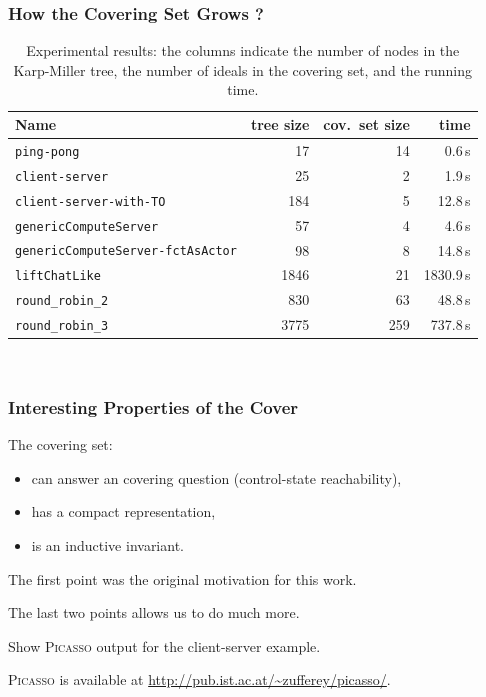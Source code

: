 \documentclass{beamer}
\newcommand{\picasso}{\textsc{Picasso}\xspace}
\begin{document}
\begin{frame}
  \frametitle{How the Covering Set Grows ?}
    \begin{table}[t]
    \centering
    {\footnotesize
    \begin{tabular}{|l|r|r|r|}
    \hline
    Name &  tree size & cov.~set size & time \\
    \hline
    \hline
    \texttt{ping-pong} & 17 & 14 & 0.6\,s \\
    \hline
    \texttt{client-server} & 25 & 2 & 1.9\,s \\
    \hline
    \texttt{client-server-with-TO} & 184 & 5 & 12.8\,s \\
    \hline
    \texttt{genericComputeServer} & 57 & 4 & 4.6\,s \\
    \hline
    \texttt{genericComputeServer-fctAsActor} & 98 & 8 & 14.8\,s \\
    \hline
    \texttt{liftChatLike} & 1846 & 21 & 1830.9\,s \\
    \hline
    \texttt{round\_robin\_2} & 830 & 63 & 48.8\,s \\
    \hline
    \texttt{round\_robin\_3} & 3775 & 259 &  737.8\,s \\
    \hline 
    \end{tabular}
    \\ [1ex]
    }
    \caption{Experimental results: the columns indicate the number of
      nodes in the Karp-Miller tree, the number of ideals in
      the covering set, and the running time.}
    \label{tbl:xp-results}
    \end{table}
\end{frame}

\begin{frame}
  \frametitle{Interesting Properties of the Cover}

  The covering set:
  \begin{itemize}
  \item can answer an covering question (control-state reachability),
  \item has a compact representation,
  \item is an inductive invariant.
  \end{itemize}

  The first point was the original motivation for this work.

  The last two points allows us to do much more.

  \vspace{2ex}

  Show \picasso output for the client-server example.

  \picasso is available at \url{http://pub.ist.ac.at/~zufferey/picasso/}.
\end{frame}
\end{document}
